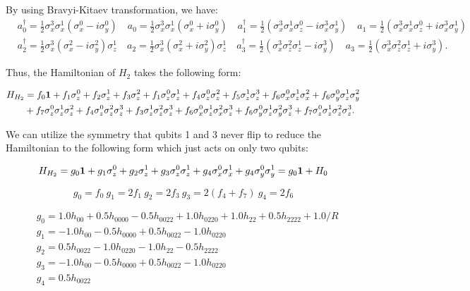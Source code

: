 \documentclass{article}
\begin{document}
By using Bravyi-Kitaev transformation\cite{seeley2012bravyi}, we have:
\begin{equation}
\label{eqn3_2}
\begin{aligned}
&a_0^{\dagger}=\frac{1}{2}\sigma_x^3\sigma_x^1(\sigma_x^0- i\sigma_y^0)\quad
a_0=\frac{1}{2}\sigma_x^3\sigma_x^1(\sigma_x^0+i\sigma_y^0)\quad
a_1^{\dagger}=\frac{1}{2}(\sigma_x^3\sigma_x^1\sigma_z^0- i\sigma_x^3\sigma_y^1)\quad
a_1=\frac{1}{2}(\sigma_x^3\sigma_x^1\sigma_z^0+i\sigma_x^3\sigma_y^1)\\
&a_2^{\dagger}=\frac{1}{2}\sigma_x^3(\sigma_x^2- i\sigma_y^2)\sigma_z^1\quad
a_2=\frac{1}{2}\sigma_x^3(\sigma_x^2+ i\sigma_y^2)\sigma_z^1\quad
a_3^{\dagger}=\frac{1}{2}(\sigma_x^3\sigma_z^2\sigma_z^1- i\sigma_y^3)\quad
a_3=\frac{1}{2}(\sigma_x^3\sigma_z^2\sigma_z^1+ i\sigma_y^3) .
\end{aligned}
\end{equation}

Thus, the Hamiltonian of $H_2$ takes the following form:

\begin{equation}
\label{eqn3_2}
\begin{aligned}
H_{H_2}&=f_0{\bf 1}+f_1\sigma_z^0+f_2\sigma_z^1+f_3\sigma_z^2+f_1\sigma_z^0\sigma_z^1+f_4\sigma_z^0\sigma_z^2+f_5\sigma_z^1\sigma_z^3+f_6\sigma_x^0\sigma_z^1\sigma_x^2+f_6\sigma_y^0\sigma_z^1\sigma_y^2\\
&+f_7\sigma_z^0\sigma_z^1\sigma_z^2+f_4\sigma_z^0\sigma_z^2\sigma_z^3+f_3\sigma_z^1\sigma_z^2\sigma_z^3+f_6\sigma_x^0\sigma_z^1\sigma_x^2\sigma_z^3+f_6\sigma_y^0\sigma_z^1\sigma_y^2\sigma_z^3+f_7\sigma_z^0\sigma_z^1\sigma_z^2\sigma_z^3 .
\end{aligned}
\end{equation}

We can utilize the symmetry that qubits 1 and 3 never flip to reduce the Hamiltonian to the following form which just acts on only two qubits:

\begin{equation}
H_{H_2}=g_0{\bf 1}+g_1\sigma_z^0+g_2\sigma_z^1+g_3\sigma_z^0\sigma_z^1+g_4\sigma_x^0\sigma_x^1+g_4\sigma_y^0\sigma_y^1=g_0{\bf 1}+H_0
\end{equation}

\begin{equation}
g_0=f_0\ g_1=2f_1\ g_2=2f_3\ g_3=2(f_4+f_7)\ g_4=2f_6
\end{equation}

\begin{equation}
\begin{aligned}
&g_0=1.0h_{00} + 0.5h_{0000} - 0.5h_{0022}+ 1.0h_{0220} + 1.0h_{22} + 0.5h_{2222} + 1.0/R\\
&g_1=-1.0h_{00} - 0.5h_{0000} + 0.5h_{0022} - 1.0h_{0220}\\
&g_2=0.5h_{0022} - 1.0h_{0220} - 1.0h_{22} - 0.5h_{2222}\\
&g_3=-1.0h_{00} - 0.5h_{0000} + 0.5h_{0022} - 1.0h_{0220}\\
&g_4=0.5h_{0022}
\end{aligned}
\end{equation}
\end{document}
